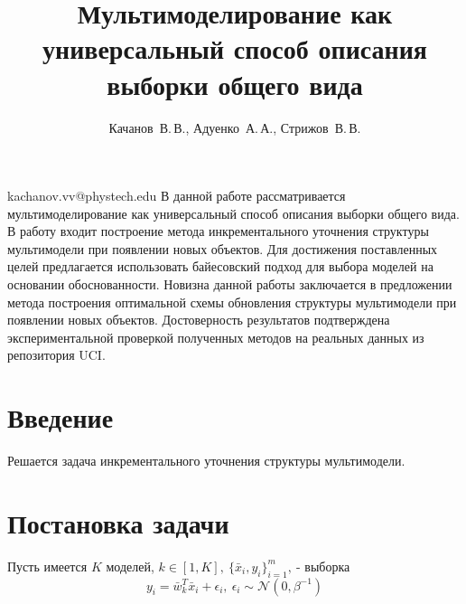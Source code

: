 \documentclass[12pt,twoside]{article}
\begin{document}
\title
    [Мультимоделирование как универсальный способ описания выборки общего вида] 
    {Мультимоделирование как универсальный способ описания выборки общего вида}
\author
    [Качанов~В.\,В.] %
    {Качанов~В.\,В., Адуенко~А.\,А., Стрижов~В.\,В.} %
\email
    {kachanov.vv@phystech.edu}
\abstract
    {В данной работе рассматривается мультимоделирование как универсальный способ описания выборки общего вида. В работу входит построение метода инкрементального уточнения структуры мультимодели при появлении новых объектов. Для достижения поставленных целей предлагается использовать байесовский подход для выбора моделей на основании обоснованности. Новизна данной работы заключается в предложении метода построения оптимальной схемы обновления структуры мультимодели при появлении новых объектов. Достоверность результатов подтверждена экспериментальной проверкой полученных методов на реальных данных из репозитория UCI.}

\maketitle
\Russian
\section{Введение}
Решается задача инкрементального уточнения структуры мультимодели. 

\section{Постановка задачи}
Пусть имеется $K$ моделей, $k \in [1,K],~\{\bar{x}_i,y_i\}_{i=1}^m,~\text{- выборка}$
$$y_i = \bar{w}_k^T\bar{x}_i+\epsilon_i,~ \epsilon_i \sim \mathcal{N}(0,\beta^{-1})$$
\end{document}
